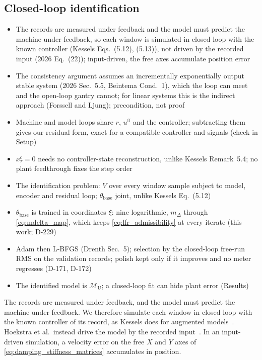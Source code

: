 \subsection{Closed-loop identification}\label{sec:aug_closed_loop}
\ifdraft
\begin{itemize}
\item The records are measured under feedback and the model must predict the machine under feedback, so each window is simulated in closed loop with the known controller (Kessels Eqs.~(5.12), (5.13)), not driven by the recorded input (2026 Eq.~(22)); input-driven, the free axes accumulate position error
\item The consistency argument assumes an incrementally exponentially output stable system (2026 Sec.~5.5, Beintema Cond.~1), which the loop can meet and the open-loop gantry cannot; for linear systems this is the indirect approach (Forssell and Ljung); precondition, not proof
\item Machine and model loops share $r$, $u^{\mathrm{ff}}$ and the controller; subtracting them gives our residual form, exact for a compatible controller and signals (check in Setup)
\item $x^{c}_\tau=0$ needs no controller-state reconstruction, unlike Kessels Remark~5.4; no plant feedthrough fixes the step order
\item The identification problem: $V$ over every window sample subject to model, encoder and residual loop; $\theta_{\mathrm{base}}$ joint, unlike Kessels Eq.~(5.12)
\item $\theta_{\mathrm{base}}$ is trained in coordinates $\xi$: nine logarithmic, $m_\Delta$ through \eqref{eq:mdelta_map}, which keeps \eqref{eq:lfr_admissibility} at every iterate (this work; D-229)
\item Adam then L-BFGS (Drenth Sec.~5); selection by the closed-loop free-run RMS on the validation records; polish kept only if it improves and no meter regresses (D-171, D-172)
\item The identified model is $\mathcal M_{\mathrm U}$; a closed-loop fit can hide plant error (Results)
\end{itemize}
\fi

The records are measured under feedback, and the model must predict the
machine under feedback.
We therefore simulate each window in closed loop with the known controller of
its record, as Kessels does for augmented
models~\cite[Eqs.~(5.12), (5.13)]{kessels2025ai}.
Hoekstra et al.\ instead drive the model by the recorded
input~\cite[Eq.~(22)]{hoekstra2026lfr}.
In an input-driven simulation, a velocity error on the free $X$ and $Y$ axes
of \eqref{eq:damping_stiffness_matrices} accumulates in position.

